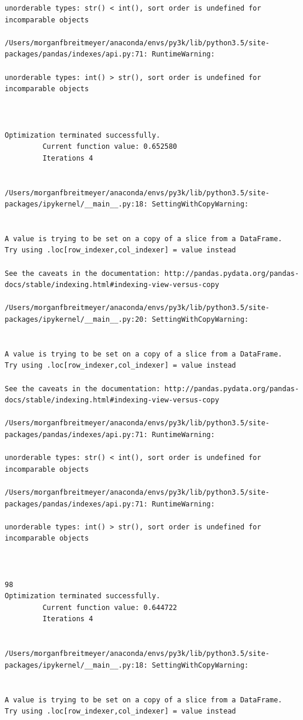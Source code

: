 \begin{lstlisting}
unorderable types: str() < int(), sort order is undefined for incomparable objects

/Users/morganfbreitmeyer/anaconda/envs/py3k/lib/python3.5/site-packages/pandas/indexes/api.py:71: RuntimeWarning:

unorderable types: int() > str(), sort order is undefined for incomparable objects



Optimization terminated successfully.
         Current function value: 0.652580
         Iterations 4


/Users/morganfbreitmeyer/anaconda/envs/py3k/lib/python3.5/site-packages/ipykernel/__main__.py:18: SettingWithCopyWarning:


A value is trying to be set on a copy of a slice from a DataFrame.
Try using .loc[row_indexer,col_indexer] = value instead

See the caveats in the documentation: http://pandas.pydata.org/pandas-docs/stable/indexing.html#indexing-view-versus-copy

/Users/morganfbreitmeyer/anaconda/envs/py3k/lib/python3.5/site-packages/ipykernel/__main__.py:20: SettingWithCopyWarning:


A value is trying to be set on a copy of a slice from a DataFrame.
Try using .loc[row_indexer,col_indexer] = value instead

See the caveats in the documentation: http://pandas.pydata.org/pandas-docs/stable/indexing.html#indexing-view-versus-copy

/Users/morganfbreitmeyer/anaconda/envs/py3k/lib/python3.5/site-packages/pandas/indexes/api.py:71: RuntimeWarning:

unorderable types: str() < int(), sort order is undefined for incomparable objects

/Users/morganfbreitmeyer/anaconda/envs/py3k/lib/python3.5/site-packages/pandas/indexes/api.py:71: RuntimeWarning:

unorderable types: int() > str(), sort order is undefined for incomparable objects



98
Optimization terminated successfully.
         Current function value: 0.644722
         Iterations 4


/Users/morganfbreitmeyer/anaconda/envs/py3k/lib/python3.5/site-packages/ipykernel/__main__.py:18: SettingWithCopyWarning:


A value is trying to be set on a copy of a slice from a DataFrame.
Try using .loc[row_indexer,col_indexer] = value instead


\end{lstlisting}
